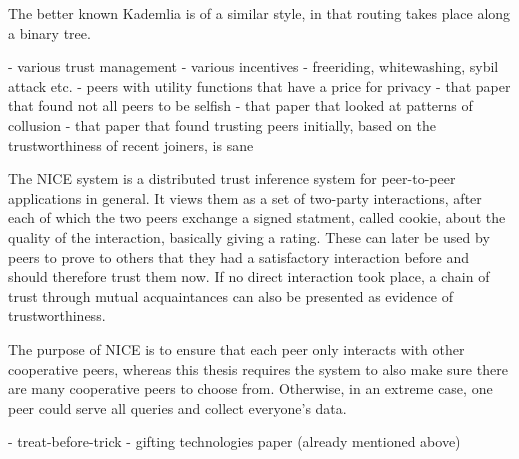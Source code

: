 The better known Kademlia\cite{maymounkov2002kademlia} is of a similar style, in
that routing takes place along a binary tree.

- various trust management
- various incentives
- freeriding, whitewashing, sybil attack etc.
- peers with utility functions that have a price for privacy
- that paper that found not all peers to be selfish
- that paper that looked at patterns of collusion
- that paper that found trusting peers initially, based on the trustworthiness
  of recent joiners, is sane

The NICE system\cite{sherwood2006cooperative} is a distributed trust inference
system for peer-to-peer applications in general. It views them as a set of
two-party interactions, after each of which the two peers exchange a signed
statment, called cookie, about the quality of the interaction, basically giving
a rating. These can later be used by peers to prove to others that they had a
satisfactory interaction before and should therefore trust them now. If no
direct interaction took place, a chain of trust through mutual acquaintances can
also be presented as evidence of trustworthiness.

The purpose of NICE is to ensure that each peer only interacts with other
cooperative peers, whereas this thesis requires the system to also make sure
there are many cooperative peers to choose from. Otherwise, in an extreme case,
one peer could serve all queries and collect everyone's data.

- treat-before-trick
- gifting technologies paper (already mentioned above)
